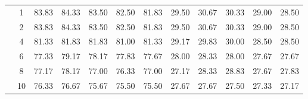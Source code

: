 \begin{table}[H]
\begin{tabular}{|c|c|c c c c c|c c c c c|}
\multicolumn{1}{|c|}{ \multirow{6}{*}{\rotatebox[origin=c]{90}{\textbf{K-vizinhos}}} }
&1	&83.83	&84.33	&83.50	&82.50	&81.83	&29.50	&30.67	&30.33	&29.00	&28.50	\\\cline{2-12}
&2	&83.83	&84.33	&83.50	&82.50	&81.83	&29.50	&30.67	&30.33	&29.00	&28.50	\\\cline{2-12}
&4	&81.33	&81.83	&81.83	&81.00	&81.33	&29.17	&29.83	&30.00	&28.50	&28.50	\\\cline{2-12}
&6	&77.33	&79.17	&78.17	&77.83	&77.67	&28.00	&28.33	&28.00	&27.67	&27.67	\\\cline{2-12}
&8	&77.17	&78.17	&77.00	&76.33	&77.00	&27.17	&28.33	&28.83	&27.67	&27.83	\\\cline{2-12}
&10	&76.33	&76.67	&75.67	&75.50	&75.50	&27.67	&27.67	&27.50	&27.33	&27.17	
	


\\\midrule

	\end{tabular}
\end{table}




